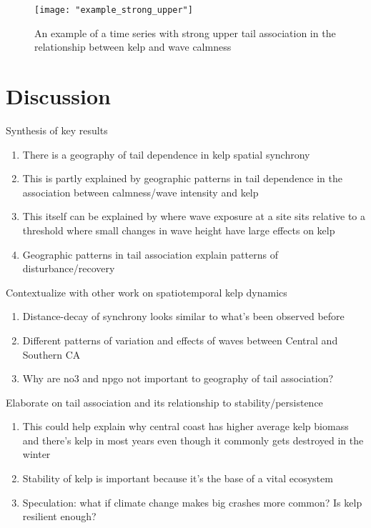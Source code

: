 \documentclass[12pt, oneside]{article}
\begin{document}
\begin{figure}
   \centering
   \texttt{[image: "example\_strong\_upper"]}
   \caption{An example of a time series with strong upper tail association in the relationship between kelp and wave calmness}
   \label{fig:lowexample}
\end{figure}



\section{Discussion}

\noindent Synthesis of key results
\begin{enumerate}
\item{There is a geography of tail dependence in kelp spatial synchrony}
\item{This is partly explained by geographic patterns in tail dependence in the association between calmness/wave intensity and kelp}
\item{This itself can be explained by where wave exposure at a site sits relative to a threshold where small changes in wave height have large effects on kelp}
\item{Geographic patterns in tail association explain patterns of disturbance/recovery}
\end{enumerate}

\noindent Contextualize with other work on spatiotemporal kelp dynamics
\begin{enumerate}
\item{Distance-decay of synchrony looks similar to what's been observed before}
\item{Different patterns of variation and effects of waves between Central and Southern CA}
\item{Why are no3 and npgo not important to geography of tail association?}
\end{enumerate}

\noindent Elaborate on tail association and its relationship to stability/persistence
\begin{enumerate}
\item{This could help explain why central coast has higher average kelp biomass and there's kelp in most years even though it commonly gets destroyed in the winter}
\item{Stability of kelp is important because it's the base of a vital ecosystem}
\item{Speculation: what if climate change makes big crashes more common? Is kelp resilient enough?}
\end{enumerate}
\end{document}
